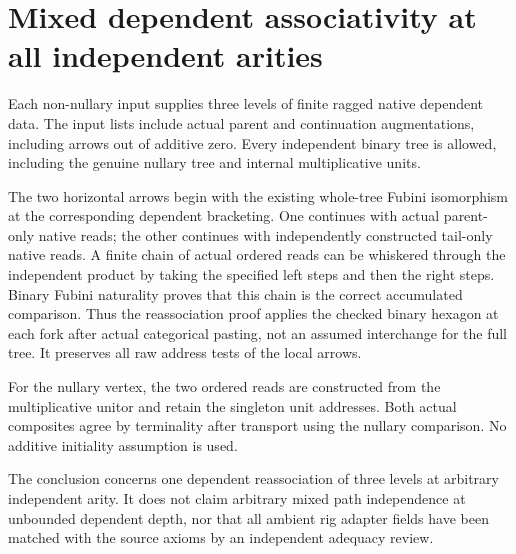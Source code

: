 \documentclass{article}
\begin{document}
\section*{Mixed dependent associativity at all independent arities}
Each non-nullary input supplies three levels of finite ragged
native dependent data. The input lists include actual parent and
continuation augmentations, including arrows out of additive zero.
Every independent binary tree is allowed, including the genuine
nullary tree and internal multiplicative units.

The two horizontal arrows begin with the existing whole-tree
Fubini isomorphism at the corresponding dependent bracketing.
One continues with actual parent-only native reads; the other
continues with independently constructed tail-only native reads.
A finite chain of actual ordered reads can be whiskered through
the independent product by taking the specified left steps and
then the right steps. Binary Fubini naturality proves that this
chain is the correct accumulated comparison. Thus the reassociation
proof applies the checked binary hexagon at each fork after
actual categorical pasting, not an assumed interchange for the
full tree. It preserves all raw address tests of the local arrows.

For the nullary vertex, the two ordered reads are constructed
from the multiplicative unitor and retain the singleton unit
addresses. Both actual composites agree by terminality after
transport using the nullary comparison. No additive initiality
assumption is used.

The conclusion concerns one dependent reassociation of three
levels at arbitrary independent arity. It does not claim arbitrary
mixed path independence at unbounded dependent depth, nor that
all ambient rig adapter fields have been matched with the source
axioms by an independent adequacy review.
\end{document}
